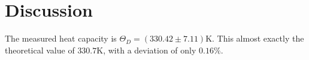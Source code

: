 \section{Discussion}
\label{sec:Diskussion}
The measured heat capacity is $\Theta_D = (330.42 \pm 7.11) \text{K}$. This almost exactly the theoretical value of $330.7\text{K}$, with a deviation of only $0.16\%$.